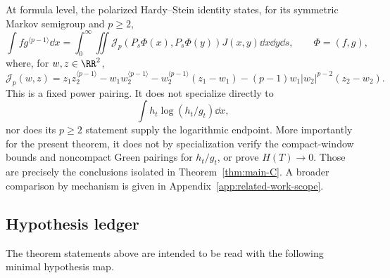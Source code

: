 At formula level, the polarized Hardy--Stein identity
\cite{BogdanGutowskiPietruskaPaluba2025PolarizedHardyStein} states, for its
symmetric Markov semigroup and \(p\ge2\),
\[
\int f g^{\langle p-1\rangle}\dd x
=\int_0^\infty\!\iint
\mathcal J_p(P_s\Phi(x),P_s\Phi(y))J(x,y)\dd x\dd y\dd s,
\qquad \Phi=(f,g),
\]
where, for \(w,z\in\RR^2\),
\[
\mathcal J_p(w,z)=z_1z_2^{\langle p-1\rangle}
-w_1w_2^{\langle p-1\rangle}-w_2^{\langle p-1\rangle}(z_1-w_1)
-(p-1)w_1|w_2|^{p-2}(z_2-w_2).
\]
This is a fixed power pairing.  It does not specialize directly to
\[
\int h_t\log(h_t/g_t)\dd x,
\]
nor does its \(p\ge2\) statement supply the logarithmic endpoint.  More
importantly for the present theorem,
it does not by specialization verify the compact-window bounds and noncompact
Green pairings for \(h_t/g_t\), or prove \(H(T)\to0\).  Those are precisely
the conclusions isolated in Theorem~\ref{thm:main-C}.  A broader comparison
by mechanism is given in Appendix~\ref{app:related-work-scope}.

\subsection*{Hypothesis ledger}
\label{subsec:intro-hypothesis-ledger}

The theorem statements above are intended to be read with the following
minimal hypothesis map.


